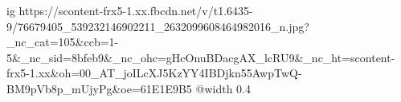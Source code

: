  
 
 
 
 

\ifcmt
  ig https://scontent-frx5-1.xx.fbcdn.net/v/t1.6435-9/76679405_539232146902211_2632099608464982016_n.jpg?_nc_cat=105&ccb=1-5&_nc_sid=8bfeb9&_nc_ohc=gHcOnuBDacgAX_lcRU9&_nc_ht=scontent-frx5-1.xx&oh=00_AT_joILcXJ5KzYY4IBDjkn55AwpTwQ-BM9pVb8p_mUjyPg&oe=61E1E9B5
  @width 0.4
\fi
